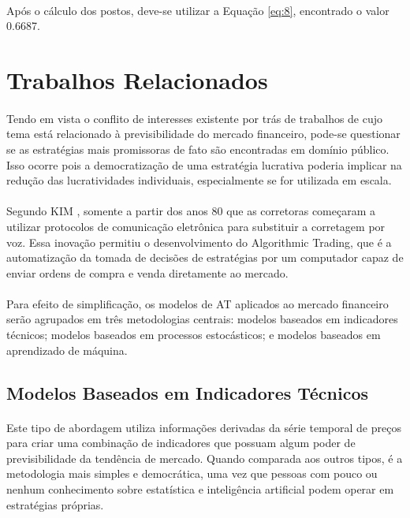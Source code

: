 \paragraph{} Após o cálculo dos postos, deve-se utilizar a Equação \ref{eq:8}, encontrado o valor 0.6687.



\section{Trabalhos Relacionados}

\paragraph{} Tendo em vista o conflito de interesses existente por trás de trabalhos de cujo tema está relacionado à previsibilidade do mercado financeiro, pode-se questionar se as estratégias mais promissoras de fato são encontradas em domínio público. Isso ocorre pois a democratização de uma estratégia lucrativa poderia implicar na redução das lucratividades individuais, especialmente se for utilizada em escala.

\paragraph{} Segundo KIM \cite{kim2010electronic}, somente a partir dos anos 80 que as corretoras começaram a utilizar protocolos de comunicação eletrônica para substituir a corretagem por voz. Essa inovação permitiu o desenvolvimento do Algorithmic Trading, que é a automatização da tomada de decisões de estratégias por um computador capaz de enviar ordens de compra e venda diretamente ao mercado.

\paragraph{} Para efeito de simplificação, os modelos de AT aplicados ao mercado financeiro serão agrupados em três metodologias centrais: modelos baseados em indicadores técnicos; modelos baseados em processos estocásticos; e modelos baseados em aprendizado de máquina.


\subsection{Modelos Baseados em Indicadores Técnicos}

\paragraph{} Este tipo de abordagem utiliza informações derivadas da série temporal de preços para criar uma combinação de indicadores que possuam algum poder de previsibilidade da tendência de mercado. Quando comparada aos outros tipos, é a metodologia mais simples e democrática, uma vez que pessoas com pouco ou nenhum conhecimento sobre estatística e inteligência artificial podem operar em estratégias próprias.

